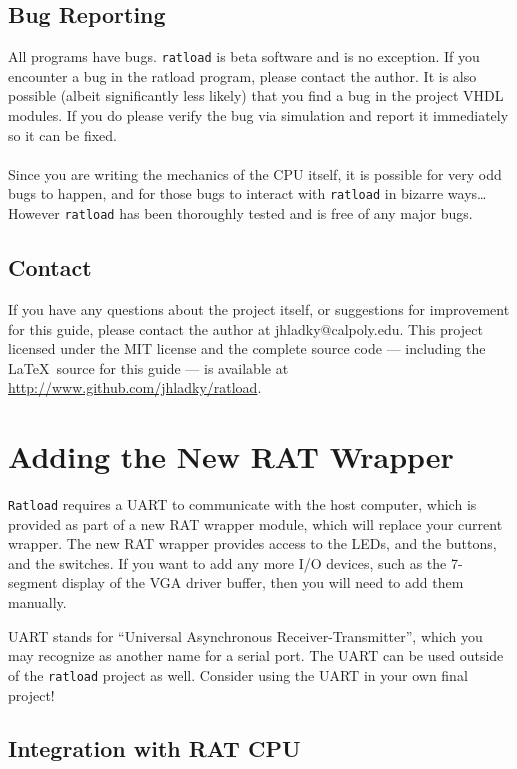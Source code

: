 \documentclass[notitlepage]{article}
\newcommand{\infosign}{\fontencoding{U}\fontfamily{futs}\huge\selectfont\char 116\relax}
\begin{document}
\subsection{Bug Reporting}
All programs have bugs. \texttt{ratload} is beta software and is no exception. If you encounter a bug in the ratload program, please contact the author. It is also possible (albeit significantly less likely) that you find a bug in the project VHDL modules. If you do please verify the bug via simulation and report it immediately so it can be fixed.\\\\
Since you are writing the mechanics of the CPU itself, it is possible for very odd bugs to happen, and for those bugs to interact with \texttt{ratload} in bizarre ways\ldots However \texttt{ratload} has been thoroughly tested and is free of any major bugs.

\subsection{Contact}
If you have any questions about the project itself, or suggestions for improvement for this guide, please contact the author at jhladky@calpoly.edu. This project licensed under the MIT license and the complete source code --- including the \LaTeX ~source for this guide --- is available at \url{http://www.github.com/jhladky/ratload}.

\section{Adding the New RAT Wrapper}
\texttt{Ratload} requires a UART to communicate with the host computer, which is provided as part of a new RAT wrapper module, which will replace your current wrapper. The new RAT wrapper provides access to the LEDs, and the buttons, and the switches. If you want to add any more I/O devices, such as the 7-segment display of the VGA driver buffer, then you will need to add them manually.

\begin{infobox}
  {\infosign} UART stands for ``Universal Asynchronous Receiver-Transmitter'', which you may recognize as another name for a serial port. The UART can be used outside of the \texttt{ratload} project as well. Consider using the UART in your own final project!
\end{infobox}

\subsection{Integration with RAT CPU}
\end{document}
